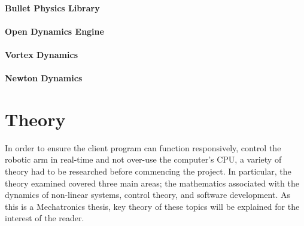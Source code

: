 \documentclass[12pt,openany,a4paper]{book}
\begin{document}
\subsubsection{Bullet Physics Library}

\subsubsection{Open Dynamics Engine}

\subsubsection{Vortex Dynamics}

\subsubsection{Newton Dynamics}



\chapter{Theory}
In order to ensure the client program can function responsively, control the robotic arm in real-time and not over-use the computer's CPU, a variety of theory had to be researched before commencing the project. In particular, the theory examined covered three main areas; the mathematics associated with the dynamics of non-linear systems, control theory, and software development. As this is a Mechatronics thesis, key theory of these topics will be explained for the interest of the reader.
\end{document}
